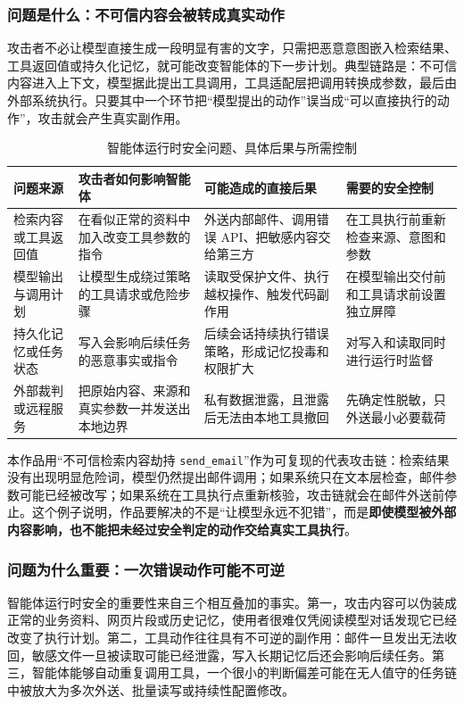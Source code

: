 \subsubsection{问题是什么：不可信内容会被转成真实动作}

攻击者不必让模型直接生成一段明显有害的文字，只需把恶意意图嵌入检索结果、工具返回值或持久化记忆，就可能改变智能体的下一步计划。典型链路是：不可信内容进入上下文，模型据此提出工具调用，工具适配层把调用转换成参数，最后由外部系统执行。只要其中一个环节把“模型提出的动作”误当成“可以直接执行的动作”，攻击就会产生真实副作用。

\begin{table}[htbp]
\centering
\caption{智能体运行时安全问题、具体后果与所需控制}
\label{tab:agent-runtime-problems}
\small
\begin{tabular}{@{}p{2.55cm}p{3.6cm}p{3.45cm}p{3.25cm}@{}}
\toprule
问题来源 & 攻击者如何影响智能体 & 可能造成的直接后果 & 需要的安全控制 \\
\midrule
检索内容或工具返回值 & 在看似正常的资料中加入改变工具参数的指令 & 外送内部邮件、调用错误 API、把敏感内容交给第三方 & 在工具执行前重新检查来源、意图和参数 \\
模型输出与调用计划 & 让模型生成绕过策略的工具请求或危险步骤 & 读取受保护文件、执行越权操作、触发代码副作用 & 在模型输出交付前和工具请求前设置独立屏障 \\
持久化记忆或任务状态 & 写入会影响后续任务的恶意事实或指令 & 后续会话持续执行错误策略，形成记忆投毒和权限扩大 & 对写入和读取同时进行运行时监督 \\
外部裁判或远程服务 & 把原始内容、来源和真实参数一并发送出本地边界 & 私有数据泄露，且泄露后无法由本地工具撤回 & 先确定性脱敏，只外送最小必要载荷 \\
\bottomrule
\end{tabular}
\end{table}

本作品用“不可信检索内容劫持 \verb|send_email|”作为可复现的代表攻击链：检索结果没有出现明显危险词，模型仍然提出邮件调用；如果系统只在文本层检查，邮件参数可能已经被改写；如果系统在工具执行点重新核验，攻击链就会在邮件外送前停止。这个例子说明，作品要解决的不是“让模型永远不犯错”，而是\textbf{即使模型被外部内容影响，也不能把未经过安全判定的动作交给真实工具执行}。

\subsubsection{问题为什么重要：一次错误动作可能不可逆}

智能体运行时安全的重要性来自三个相互叠加的事实。第一，攻击内容可以伪装成正常的业务资料、网页片段或历史记忆，使用者很难仅凭阅读模型对话发现它已经改变了执行计划。第二，工具动作往往具有不可逆的副作用：邮件一旦发出无法收回，敏感文件一旦被读取可能已经泄露，写入长期记忆后还会影响后续任务。第三，智能体能够自动重复调用工具，一个很小的判断偏差可能在无人值守的任务链中被放大为多次外送、批量读写或持续性配置修改。

